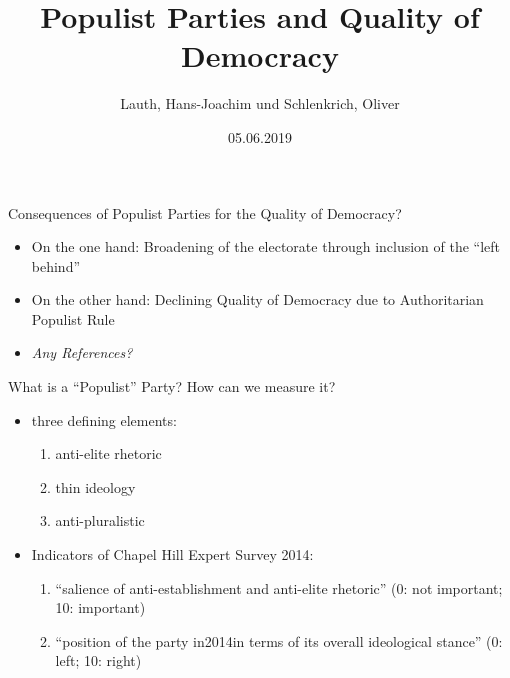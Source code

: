 \documentclass[
  ignorenonframetext,
]{beamer}
\title{Populist Parties and Quality of Democracy}
\author{Lauth, Hans-Joachim und Schlenkrich, Oliver}
\date{05.06.2019}
\providecommand{\tightlist}{%
  \setlength{\itemsep}{0pt}\setlength{\parskip}{0pt}}
\begin{document}
\frame{\titlepage}

\begin{frame}{Consequences of Populist Parties for the Quality of
Democracy?}
\protect\hypertarget{consequences-of-populist-parties-for-the-quality-of-democracy}{}

\begin{itemize}
\tightlist
\item
  On the one hand: Broadening of the electorate through inclusion of the
  ``left behind''
\item
  On the other hand: Declining Quality of Democracy due to Authoritarian
  Populist Rule
\item
  \emph{Any References?}
\end{itemize}

\end{frame}

\begin{frame}{What is a ``Populist'' Party? How can we measure it?}
\protect\hypertarget{what-is-a-populist-party-how-can-we-measure-it}{}

\begin{itemize}
\tightlist
\item
  three defining elements:

  \begin{enumerate}
  \tightlist
  \item
    anti-elite rhetoric
  \item
    thin ideology
  \item
    anti-pluralistic
  \end{enumerate}
\item
  Indicators of Chapel Hill Expert Survey 2014:

  \begin{enumerate}
  \tightlist
  \item
    ``salience of anti-establishment and anti-elite rhetoric'' (0: not
    important; 10: important)
  \item
    ``position of the party in2014in terms of its overall ideological
    stance'' (0: left; 10: right)
  \end{enumerate}
\end{itemize}

\end{frame}
\end{document}

